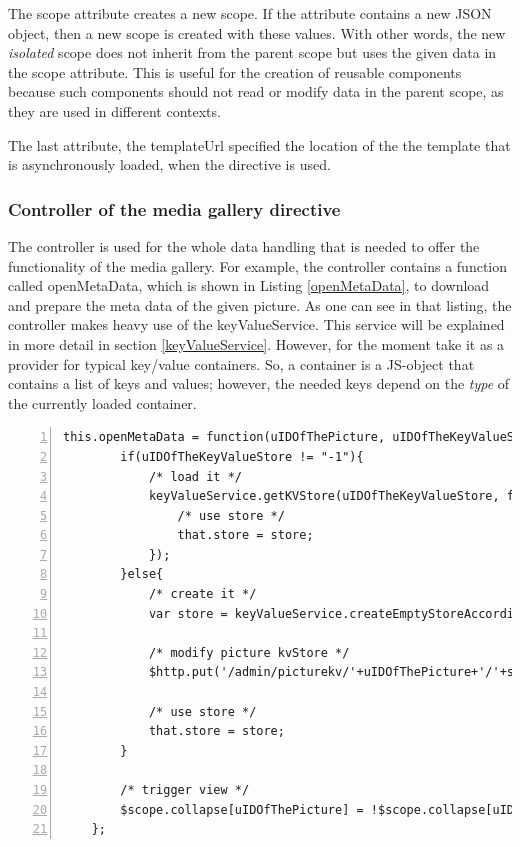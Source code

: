 The scope attribute creates a new scope. If the attribute contains a new \ac{JSON} object, then a new scope is created with these values. With other words, the new \emph{isolated} scope does not inherit from the parent scope but uses the given data in the scope attribute. This is useful for the creation of reusable components because such components should not  read or modify data in the parent scope, as they are used in different contexts. 

The last attribute, the templateUrl specified the location of the the template that is asynchronously loaded, when the directive is used.

\subsubsection{Controller of the media gallery directive}
The controller is used for the whole data handling that is needed to offer the functionality of the media gallery. For example, the controller contains a function called openMetaData, which is shown in Listing \ref{openMetaData}, to download and prepare the meta data of the given picture. As one can see in that listing, the controller makes heavy use of the keyValueService. This service will be explained in more detail in section \ref{keyValueService}. However, for the moment take it as a provider for typical key/value containers. So, a container is a \ac{JS}-object that contains a list of keys and values; however, the needed keys depend on the \emph{type} of the currently loaded container. 

\begin{lstlisting}[numbers=left,caption={The listing shows the openMetaData function},label=openMetaData,frame=tlbr,breaklines]
    this.openMetaData = function(uIDOfThePicture, uIDOfTheKeyValueStore){
        if(uIDOfTheKeyValueStore != "-1"){
            /* load it */
            keyValueService.getKVStore(uIDOfTheKeyValueStore, function(store){
                /* use store */
                that.store = store;
            });
        }else{
            /* create it */
            var store = keyValueService.createEmptyStoreAccordingToType('img');

            /* modify picture kvStore */
            $http.put('/admin/picturekv/'+uIDOfThePicture+'/'+store.uID);

            /* use store */
            that.store = store;
        }

        /* trigger view */
        $scope.collapse[uIDOfThePicture] = !$scope.collapse[uIDOfThePicture];
    };
\end{lstlisting}

